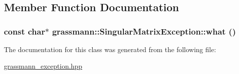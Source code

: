 \subsection{Member Function Documentation}
\hypertarget{classgrassmann_1_1SingularMatrixException_21f4b39796e44892284b714e1a631fd1}{
\subsubsection[what]{\setlength{\rightskip}{0pt plus 5cm}const char$\ast$ grassmann::SingularMatrixException::what ()}}
\label{classgrassmann_1_1SingularMatrixException_21f4b39796e44892284b714e1a631fd1}




The documentation for this class was generated from the following file:\begin{CompactItemize}
\item 
\hyperlink{grassmann__exception_8hpp}{grassmann\_\-exception.hpp}\end{CompactItemize}
